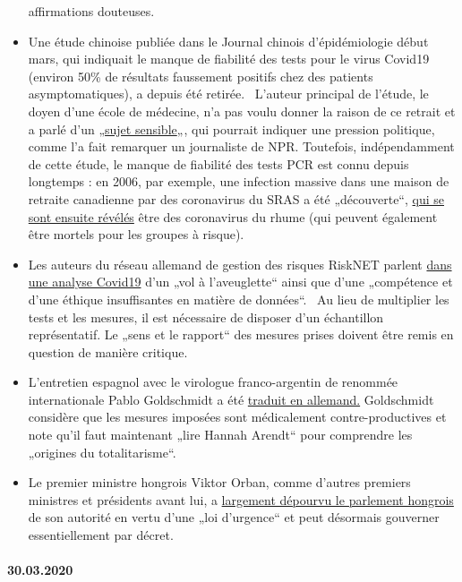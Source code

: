 \begin{itemize}
  affirmations douteuses.
\item
  Une étude chinoise publiée dans le Journal chinois d'épidémiologie
  début mars, qui indiquait le manque de fiabilité des tests pour le
  virus Covid19 (environ 50\% de résultats faussement positifs chez des
  patients asymptomatiques), a depuis été retirée.~ L'auteur principal
  de l'étude, le doyen d'une école de médecine, n'a pas voulu donner la
  raison de ce retrait et a parlé d'un
  „\href{https://www.npr.org/sections/health-shots/2020/03/26/822084429/in-defense-of-coronavirus-testing-strategy-administration-cited-retracted-study}{sujet
  sensible}„, qui pourrait indiquer une pression politique, comme l'a
  fait remarquer un journaliste de NPR. Toutefois, indépendamment de
  cette étude, le manque de fiabilité des tests PCR est connu depuis
  longtemps : en 2006, par exemple, une infection massive dans une
  maison de retraite canadienne par des coronavirus du SRAS a été
  „découverte``,
  \href{https://www.ncbi.nlm.nih.gov/pmc/articles/PMC2095096/}{qui se
  sont ensuite révélés} être des coronavirus du rhume (qui peuvent
  également être mortels pour les groupes à risque).
\item
  Les auteurs du réseau allemand de gestion des risques RiskNET parlent
  \href{https://www.risknet.de/themen/risknews/covid-19-und-der-blindflug/}{dans
  une analyse Covid19} d'un „vol à l'aveuglette`` ainsi que d'une
  „compétence et d'une éthique insuffisantes en matière de données``.~
  Au lieu de multiplier les tests et les mesures, il est nécessaire de
  disposer d'un échantillon représentatif. Le „sens et le rapport`` des
  mesures prises doivent être remis en question de manière critique.
\item
  L'entretien espagnol avec le virologue franco-argentin de renommée
  internationale Pablo Goldschmidt a été
  \href{https://www.rubikon.news/artikel/der-corona-totalitarismus}{traduit
  en allemand.} Goldschmidt considère que les mesures imposées sont
  médicalement contre-productives et note qu'il faut maintenant „lire
  Hannah Arendt`` pour comprendre les „origines du totalitarisme``.
\item
  Le premier ministre hongrois Viktor Orban, comme d'autres premiers
  ministres et présidents avant lui, a
  \href{https://www.krone.at/2127086}{largement dépourvu le parlement
  hongrois} de son autorité en vertu d'une „loi d'urgence`` et peut
  désormais gouverner essentiellement par décret.
\end{itemize}

\hypertarget{30032020}{%
\paragraph{30.03.2020}\label{30032020}}


